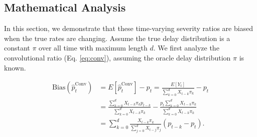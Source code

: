 \documentclass{article}
\begin{document}
\subsection{Mathematical Analysis}\label{sec:analysis}

In this section, we demonstrate that these time-varying severity ratios are biased when the true rates are changing. Assume the true delay distribution is a constant $\pi$ over all time with maximum length $d$. We first analyze the convolutional ratio (Eq. \ref{eq:conv}), assuming the oracle delay distribution $\pi$ is known.


\begin{align}\label{eq:ConvBias}
    \text{Bias}(\hat{p}_t^\text{Conv}) &= E[\hat{p}_t^\text{Conv}] - p_t = \frac{E[Y_t]}{\sum_{k=0}^d X_{t-k}\pi_k} - p_t \nonumber\\ 
    &= \frac{\sum_{k=0}^d X_{t-k}\pi_k p_{t-k}}{\sum_{k=0}^d X_{t-k}\pi_k} - \frac{p_t \sum_{k=0}^d X_{t-k}\pi_k}{\sum_{k=0}^d X_{t-k}\pi_k}\nonumber\\
    &= \sum_{k=0}^d \frac{X_{t-k}\pi_k}{\sum_{j=0}^d X_{t-j}\pi_j} (p_{t-k}-p_t).
\end{align}
\end{document}
